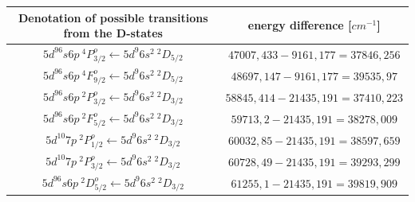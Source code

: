 \documentclass[parskip,12pt,headsepline,a4paper] {scrbook}
\begin{document}
\begin{table}[h]
{}
\label{autransdenotation}
\begin{center}
\begin{tabular}{c|c}

Denotation of possible transitions from the D-states & energy difference [$cm^{-1}$] \\
\hline
\rowcolor{hellgrau}
$5d^96s6p \ ^4P^o_{3/2} \leftarrow 5d^{9} 6s^{2} \ ^2D_{5/2}$ & $47007,433 - 9161,177 = 37846,256$ \\
\rowcolor{dunkelgrau}
$5d^96s6p \ ^4F^o_{9/2} \leftarrow 5d^{9} 6s^{2} \ ^2D_{5/2}$ &  $48697,147 - 9161,177 = 39535,97$ \\
\rowcolor{hellgrau}
$5d^96s6p \ ^2P^o_{3/2} \leftarrow 5d^{9} 6s^{2} \ ^2D_{3/2}$ & $58845,414 - 21435,191 = 37410,223$ \\
\rowcolor{dunkelgrau}
$5d^96s6p \ ^2F^o_{5/2} \leftarrow 5d^{9} 6s^{2} \ ^2D_{3/2}$ & $59713,2 - 21435,191 = 38278,009$ \\
\rowcolor{hellgrau}
$5d^{10}7p \ ^2P^o_{1/2} \leftarrow 5d^{9} 6s^{2} \ ^2D_{3/2}$ & $60032,85 - 21435,191 = 38597,659$ \\
\rowcolor{dunkelgrau}
$5d^{10}7p \ ^2P^o_{3/2} \leftarrow 5d^{9} 6s^{2} \ ^2D_{3/2}$ & $60728,49 - 21435,191 = 39293,299$ \\
\rowcolor{hellgrau}
$5d^96s6p \ ^2D^o_{5/2} \leftarrow 5d^{9} 6s^{2} \ ^2D_{3/2}$ & $61255,1 - 21435,191 = 39819,909$ \\
\end{tabular}
\end{center}
\end{table}
\end{document}
